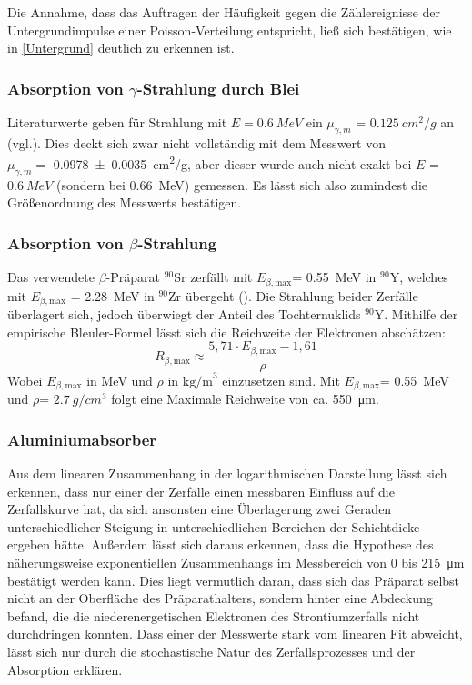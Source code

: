 \documentclass[
	a4paper,
	12pt,
	pagesize,
	ngerman
]{scrartcl}
\begin{document}
	Die Annahme, dass das Auftragen der Häufigkeit gegen die Zählereignisse der Untergrundimpulse einer Poisson-Verteilung entspricht, ließ sich bestätigen, wie in \cref{Untergrund} deutlich zu erkennen ist.
	
	\subsubsection{Absorption von $\gamma$-Strahlung durch Blei}
	Literaturwerte geben für Strahlung mit $E=\SI{0,6}{MeV}$ ein $\mu_{\gamma,m}$ = $\SI{0,125}{cm^2/g}$ an (vgl.\cite{absorption_blei}).
	Dies deckt sich zwar nicht vollständig mit dem Messwert von \\
	$\mu_{\gamma,m} = $ \SI{0,0978 \pm 0,0035}{cm^2/g}, 
	aber dieser wurde auch nicht exakt bei $E$ = $\SI{0,6}{MeV}$ (sondern bei \SI{0,66}{MeV}) gemessen.
	Es lässt sich also zumindest die Größenordnung des Messwerts bestätigen.
	
	\subsubsection{Absorption von $\beta$-Strahlung}
	Das verwendete $\beta$-Präparat $^{90}$Sr zerfällt mit $E_{\beta,\text{max}}$= \SI{0,55}{MeV} in $^{90}$Y, welches mit $E_{\beta,\text{max}}$ = \SI{2,28}{MeV} in $^{90}$Zr übergeht (\cite{Einfuehrung}).
	Die Strahlung beider Zerfälle überlagert sich, jedoch überwiegt der Anteil des Tochternuklids $^{90}$Y. 
	Mithilfe der empirische Bleuler-Formel lässt sich die Reichweite der Elektronen abschätzen:
	\begin{equation}
	R_{\beta,\text{max}} \approx \frac{5,71 \cdot E_{\beta,\text{max}} - 1,61}{\rho}
	\label{Bleuler}
	\end{equation} %
	Wobei $E_{\beta,\text{max}}$ in MeV und $\rho$ in $\text{kg/m}^3$ einzusetzen sind.
	Mit $E_{\beta,\text{max}}$= \SI{0,55}{MeV} und $\rho$= $\SI{2,7}{g/cm^3}$ folgt eine Maximale Reichweite von ca. \SI{550}{\micro\meter}.
	
	\subsubsection*{Aluminiumabsorber}
	Aus dem linearen Zusammenhang in der logarithmischen Darstellung lässt sich erkennen, dass nur einer der Zerfälle einen messbaren Einfluss auf die Zerfallskurve hat, da sich ansonsten eine Überlagerung zwei Geraden unterschiedlicher Steigung in unterschiedlichen Bereichen der Schichtdicke ergeben hätte.
	Außerdem lässt sich daraus erkennen, dass die Hypothese des näherungsweise exponentiellen Zusammenhangs im Messbereich von 0 bis \SI{215}{\micro \meter} bestätigt werden kann.
	Dies liegt vermutlich daran, dass sich das Präparat selbst nicht an der Oberfläche des Präparathalters, sondern hinter eine Abdeckung befand, die die niederenergetischen Elektronen des Strontiumzerfalls nicht durchdringen konnten.
	Dass einer der Messwerte stark vom linearen Fit abweicht, lässt sich nur durch die stochastische Natur des Zerfallsprozesses und der Absorption erklären.
	
\end{document}
